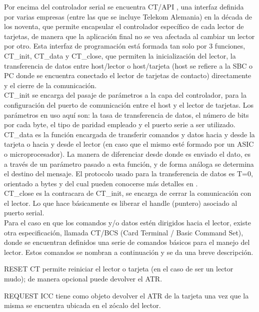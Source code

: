 \bigskip
{}
Por encima del controlador serial se encuentra CT/API \cite{ctapi}, una interfaz definida por varias empresas (entre las que se incluye Telekom Alemania) en la década de los noventa, que permite encapsular el controlador específico de cada lector de tarjetas, de manera que la aplicación final no se vea afectada al cambiar un lector por otro.
Esta interfaz de programación está formada tan solo por 3 funciones, CT\_init, CT\_data y CT\_close, que permiten la inicialización del lector, la transferencia de datos entre host/lector o host/tarjeta (host se refiere a la SBC o PC donde se encuentra conectado el lector de tarjetas de contacto) directamente y el cierre de la comunicación.\\
CT\_init se encarga del pasaje de parámetros a la capa del controlador, para la configuración del puerto de comunicación entre el host y el lector de tarjetas. Los parámetros en uso aquí son: la tasa de transferencia de datos, el número de bits por cada byte, el tipo de paridad empleado y el puerto serie a ser utilizado.\\
CT\_data es la función encargada de transferir comandos y datos hacia y desde la tarjeta o hacia y desde el lector (en caso que el mismo esté formado por un ASIC o microprocesador). La manera de diferenciar desde donde es enviado el dato, es a través de un parámetro pasado a esta función, y de forma análoga se determina el destino del mensaje. El protocolo usado para la transferencia de datos es T=0, orientado a bytes y del cual pueden conocerse más detalles en \cite{SCHb}.\\
CT\_close es la contracara de  CT\_init, se encarga de cerrar la comunicación con el lector. Lo que hace básicamente es liberar el handle (puntero) asociado al puerto serial.\\
Para el caso en que los comandos y/o datos estén dirigidos hacia el lector, existe otra especificación, llamada CT/BCS \cite{ctbcs} (Card Terminal / Basic Command Set), donde se encuentran definidos una serie de comandos básicos para el manejo del lector. Estos comandos se nombran a continuación y se da una breve descripción.

\bigskip
RESET CT permite reiniciar el lector o tarjeta (en el caso de ser un lector mudo); de manera opcional puede devolver el ATR.

REQUEST ICC tiene como objeto devolver el ATR de la tarjeta una vez que la misma se encuentra ubicada en el zócalo del lector.

